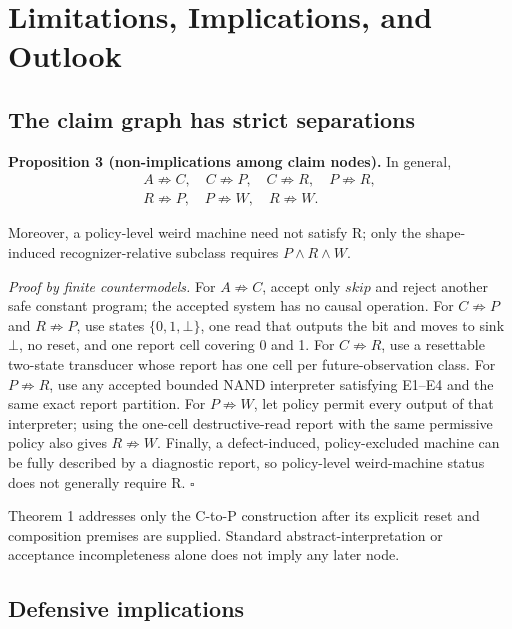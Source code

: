 \documentclass[conference]{IEEEtran}
\begin{document}
\section{Limitations, Implications, and Outlook}

\subsection{The claim graph has strict separations}

\medskip
\noindent\textbf{Proposition 3 (non-implications among claim nodes).}
In general,
\begin{equation}
\begin{gathered}
A\not\Rightarrow C,\quad
C\not\Rightarrow P,\quad
C\not\Rightarrow R,\quad
P\not\Rightarrow R,\\
R\not\Rightarrow P,\quad
P\not\Rightarrow W,\quad
R\not\Rightarrow W.
\end{gathered}
\end{equation}

Moreover, a policy-level weird machine need not satisfy R; only the shape-induced recognizer-relative subclass requires $P\land R\land W$.

\emph{Proof by finite countermodels.} For $A\not\Rightarrow C$, accept only $\mathit{skip}$ and reject another safe constant program; the accepted system has no causal operation. For $C\not\Rightarrow P$ and $R\not\Rightarrow P$, use states $\{0,1,\bot\}$, one read that outputs the bit and moves to sink $\bot$, no reset, and one report cell covering 0 and 1. For $C\not\Rightarrow R$, use a resettable two-state transducer whose report has one cell per future-observation class. For $P\not\Rightarrow R$, use any accepted bounded NAND interpreter satisfying E1--E4 and the same exact report partition. For $P\not\Rightarrow W$, let policy permit every output of that interpreter; using the one-cell destructive-read report with the same permissive policy also gives $R\not\Rightarrow W$. Finally, a defect-induced, policy-excluded machine can be fully described by a diagnostic report, so policy-level weird-machine status does not generally require R. \hfill$\square$

Theorem 1 addresses only the C-to-P construction after its explicit reset and composition premises are supplied. Standard abstract-interpretation or acceptance incompleteness alone does not imply any later node.

\subsection{Defensive implications}
\end{document}
